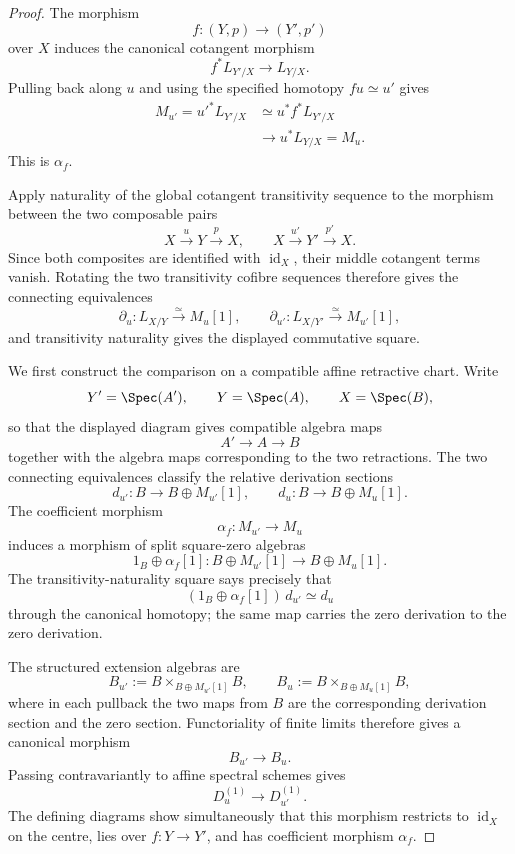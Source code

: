 \begin{proof}
The morphism
\[
    f:(Y,p)\longrightarrow(Y',p')
\]
over $X$ induces the canonical cotangent morphism
\[
    f^*L_{Y'/X}
    \longrightarrow
    L_{Y/X}.
\]
Pulling back along $u$ and using the specified homotopy
$fu\simeq u'$ gives
\[
\begin{aligned}
    M_{u'}
    =
    u'^*L_{Y'/X}
    &\simeq
    u^*f^*L_{Y'/X}\\
    &\longrightarrow
    u^*L_{Y/X}
    =
    M_u.
\end{aligned}
\]
This is $\alpha_f$.

Apply naturality of the global cotangent transitivity sequence to the
morphism between the two composable pairs
\[
    X\xrightarrow{u}Y\xrightarrow{p}X,
    \qquad
    X\xrightarrow{u'}Y'\xrightarrow{p'}X.
\]
Since both composites are identified with
$\operatorname{id}_X$, their middle cotangent terms vanish.  Rotating the two
transitivity cofibre sequences therefore gives the connecting equivalences
\[
    \partial_u:
    L_{X/Y}
    \xrightarrow{\simeq}
    M_u[1],
    \qquad
    \partial_{u'}:
    L_{X/Y'}
    \xrightarrow{\simeq}
    M_{u'}[1],
\]
and transitivity naturality gives the displayed commutative square.

We first construct the comparison on a compatible affine retractive chart.
Write
\[
    Y'=\Spec(A'),
    \qquad
    Y=\Spec(A),
    \qquad
    X=\Spec(B),
\]
so that the displayed diagram gives compatible algebra maps
\[
    A'\longrightarrow A\longrightarrow B
\]
together with the algebra maps corresponding to the two retractions.
The two connecting equivalences classify the relative derivation sections
\[
    d_{u'}:
    B\longrightarrow B\oplus M_{u'}[1],
    \qquad
    d_u:
    B\longrightarrow B\oplus M_u[1].
\]
The coefficient morphism
\[
    \alpha_f:M_{u'}\longrightarrow M_u
\]
induces a morphism of split square-zero algebras
\[
    1_B\oplus\alpha_f[1]:
    B\oplus M_{u'}[1]
    \longrightarrow
    B\oplus M_u[1].
\]
The transitivity-naturality square says precisely that
\[
    (1_B\oplus\alpha_f[1])\,d_{u'}
    \simeq
    d_u
\]
through the canonical homotopy; the same map carries the zero derivation to
the zero derivation.

The structured extension algebras are
\[
    B_{u'}
    :=
    B\times_{B\oplus M_{u'}[1]}B,
    \qquad
    B_u
    :=
    B\times_{B\oplus M_u[1]}B,
\]
where in each pullback the two maps from $B$ are the corresponding
derivation section and the zero section.  Functoriality of finite limits
therefore gives a canonical morphism
\[
    B_{u'}
    \longrightarrow
    B_u.
\]
Passing contravariantly to affine spectral schemes gives
\[
    D^{(1)}_u
    \longrightarrow
    D^{(1)}_{u'}.
\]
The defining diagrams show simultaneously that this morphism restricts to
$\operatorname{id}_X$ on the centre, lies over
$f:Y\to Y'$, and has coefficient morphism $\alpha_f$.


\end{proof}
